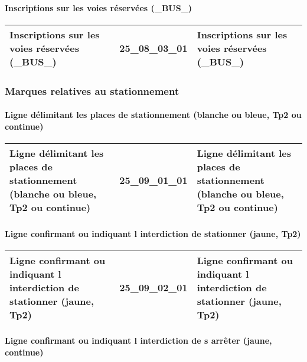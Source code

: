 \documentclass[12pt,titlepage]{book}
\begin{document}
\paragraph{Inscriptions sur les voies réservées (\_BUS\_)}
\noindent
\vspace{\baselineskip}

\renewcommand{\arraystretch}{1.2}
\begin{supertabular}{|p{10cm}|c|p{15cm}|}
 Inscriptions sur les voies réservées (\_BUS\_) & 25\_08\_03\_01 & Inscriptions sur les voies réservées (\_BUS\_)\\
\hline
\end{supertabular}

\subsubsection{\large Marques relatives au stationnement}
\paragraph{Ligne délimitant les places de stationnement (blanche ou bleue, Tp2 ou continue)}
\noindent
\vspace{\baselineskip}

\renewcommand{\arraystretch}{1.2}
\begin{supertabular}{|p{10cm}|c|p{15cm}|}
 Ligne délimitant les places de stationnement (blanche ou bleue, Tp2 ou continue) & 25\_09\_01\_01 & Ligne délimitant les places de stationnement (blanche ou bleue, Tp2 ou continue)\\
\hline
\end{supertabular}


\paragraph{Ligne confirmant ou indiquant l interdiction de stationner (jaune, Tp2)}
\noindent
\vspace{\baselineskip}

\renewcommand{\arraystretch}{1.2}
\begin{supertabular}{|p{10cm}|c|p{15cm}|}
 Ligne confirmant ou indiquant l interdiction de stationner (jaune, Tp2) & 25\_09\_02\_01 & Ligne confirmant ou indiquant l interdiction de stationner (jaune, Tp2)\\
\hline
\end{supertabular}


\paragraph{Ligne confirmant ou indiquant l interdiction de s arrêter (jaune, continue)}
\noindent
\vspace{\baselineskip}
\end{document}
